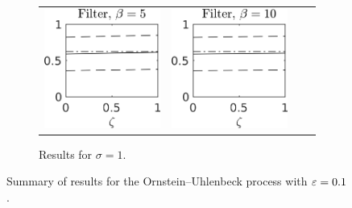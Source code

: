 \documentclass[10pt]{article}
\begin{document}
\begin{figure}[t]
\begin{subfigure}{\linewidth}
\begin{tabular}{cccc}
			\includegraphics[]{Figures/A2_filt_s10_b5.png} & \includegraphics[]{Figures/A2_filt_s10_b10.png}
		\end{tabular}	
		\caption{Results for $\sigma = 1$.}
	\end{subfigure}
	\caption{Summary of results for the Ornstein--Uhlenbeck process with $\varepsilon=0.1$.}
	\label{fig:Result_OU_2}
\end{figure}
\end{document}
